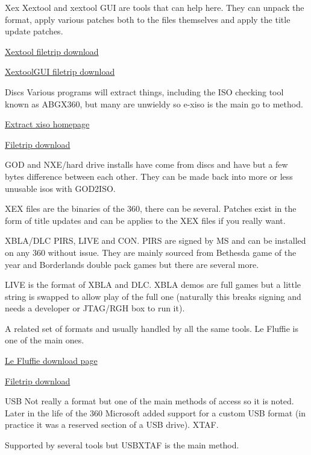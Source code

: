 \documentclass[
]{book}
\begin{document}
Xex Xextool and xextool GUI are tools that can help here. They can unpack the format, apply various patches both to the files themselves and apply the title update patches.

\href{http://filetrip.net/360-downloads/iso-tools/latest-xextool-f29383.html}{Xextool filetrip download}

\href{http://filetrip.net/360-downloads/iso-tools/latest-xextool-gui-f29384.html}{XextoolGUI filetrip download}

Discs Various programs will extract things, including the ISO checking tool known as ABGX360, but many are unwieldy so e-xiso is the main go to method.

\href{http://alecsis.free.fr/Extract-xiso/}{Extract xiso homepage}

\href{http://filetrip.net/360-downloads/iso-tools/download-e-xisogui-1007-f28976.html}{Filetrip download}

GOD and NXE/hard drive installs have come from discs and have but a few bytes difference between each other. They can be made back into more or less unusable isos with GOD2ISO.

XEX files are the binaries of the 360, there can be several. Patches exist in the form of title updates and can be applies to the XEX files if you really want.

XBLA/DLC PIRS, LIVE and CON. PIRS are signed by MS and can be installed on any 360 without issue. They are mainly sourced from Bethesda game of the year and Borderlands double pack games but there are several more.

LIVE is the format of XBLA and DLC. XBLA demos are full games but a little string is swapped to allow play of the full one (naturally this breaks signing and needs a developer or JTAG/RGH box to run it).

A related set of formats and usually handled by all the same tools. Le Fluffie is one of the main ones.

\href{http://skunkiebutt.com/?page_id=362}{Le Fluffie download page}

\href{http://filetrip.net/360-downloads/other-files/download-le-fluffie-690025-f28975.html}{Filetrip download}

USB Not really a format but one of the main methods of access so it is noted. Later in the life of the 360 Microsoft added support for a custom USB format (in practice it was a reserved section of a USB drive). XTAF.

Supported by several tools but USBXTAF is the main method.
\end{document}

